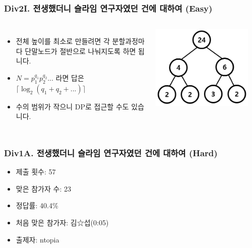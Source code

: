 \documentclass[xetex]{beamer}
\begin{document}
\begin{frame}
  \frametitle{Div2I. 전생했더니 슬라임 연구자였던 건에 대하여 (Easy)}
  \begin{columns}
      \begin{itemize}
        \item 전체 높이를 최소로 만들려면 각 분할과정마다 단말노드가 절반으로 나눠지도록 하면 됩니다.
        \item $N = p_1^{q_1} p_2^{q_2} ...$ 라면 답은 $\lceil \log_2(q_1 + q_2 + ...) \rceil$
        \item 수의 범위가 작으니 DP로 접근할 수도 있습니다.
      \end{itemize}
      \includegraphics[width=0.9\textwidth]{slime-sol-1.png}
  \end{columns}
\end{frame}

\begin{frame}
  \frametitle{Div1A. 전생했더니 슬라임 연구자였던 건에 대하여 (Hard)}
  \begin{itemize}
    \item 제출 횟수: 57
    \item 맞은 참가자 수: 23
    \item 정답률: 40.4\%
    \item 처음 맞은 참가자: 김☆섭(0:05)
    \item 출제자: ntopia
  \end{itemize}
\end{frame}
\end{document}
